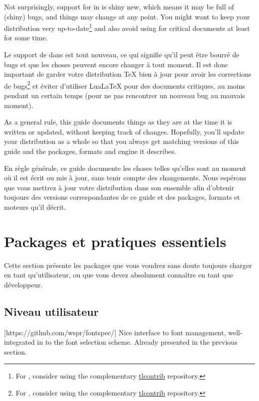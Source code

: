 \documentclass{lltxdoc}
\begin{document}
Not surprisingly, support for \luatex in \latex is shiny new, which means it
may be full of (shiny) bugs, and things may change at any point. You might
want to keep your \tex distribution very up-to-date\footnote{For \texlive,
  consider using the complementary
  \href{http://tlcontrib.metatex.org/} {tlcontrib} repository.} and also avoid
using \lualatex for critical documents at least for some time.

Le support de \luatex dans \latex est tout nouveau, ce qui signifie qu'il peut être bourré de bugs et que les choses peuvent encore changer à tout moment. Il est donc important de garder votre distribution TeX bien à jour pour avoir les corrections de bugs\footnote{For \texlive, consider using the complementary \href{http://tlcontrib.metatex.org/}{tlcontrib} repository.} et éviter d'utiliser LuaLaTeX pour des documents critiques, au moins pendant un certain temps (pour ne pas rencontrer un nouveau bug au mauvais moment).

As a general rule, this guide documents things as they are at the time it is
written or updated, without keeping track of changes. Hopefully, you'll update
your distribution as a whole so that you always get matching versions of this
guide and the packages, formats and engine it describes.

En règle générale, ce guide documente les choses telles qu'elles sont au moment où il est écrit ou mis à jour, sans tenir compte des changements. Nous espérons que vous mettrez à jour votre distribution dans son ensemble afin d'obtenir toujours des versions correspondantes de ce guide et des packages, formats et moteurs qu'il décrit.


\section{Packages et pratiques essentiels}\label{essential}

Cette section présente les packages que vous voudrez sans doute toujours
charger en tant qu'utilisateur, ou que vous devez absolument connaître
en tant que développeur.

\subsection{Niveau utilisateur}

[https://github.com/wspr/fontspec/]
Nice interface to font management, well-integrated in to the \latex font
selection scheme. Already presented in the previous section.
\end{document}
